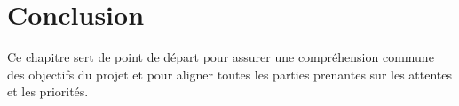 \section{Conclusion}

Ce chapitre sert de point de départ pour assurer une compréhension commune des objectifs du projet et pour aligner toutes les parties prenantes sur les attentes et les priorités.